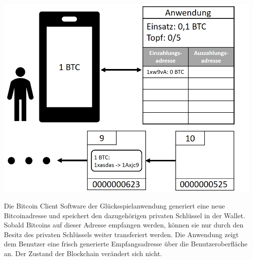 \vspace{1cm}
\begin{minipage}{0.55\textwidth}
\includegraphics[width=\textwidth]{Figures/konzept_btc/konzept2}
\centering
\decoRule
{}
\label{fig:konzept2}
\end{minipage}
\begin{minipage}{0.45\textwidth}
Die Bitcoin Client Software der Glücksspielanwendung generiert eine neue Bitcoinadresse und speichert den dazugehörigen privaten Schlüssel in der Wallet. Sobald Bitcoins auf dieser Adresse empfangen werden, können sie nur durch den Besitz des privaten Schlüssels weiter transferiert werden.
Die Anwendung zeigt dem Benutzer eine frisch generierte Empfangsadresse über die Benutzeroberfläche an. Der Zustand der Blockchain verändert sich nicht.
\end{minipage}

